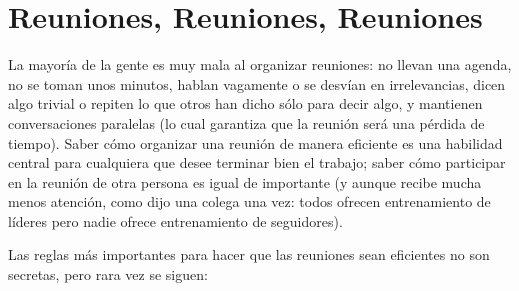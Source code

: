 \chapter{Reuniones, Reuniones, Reuniones}\label{s:meetings}

La mayoría de la gente es muy mala al organizar reuniones:
no llevan una agenda,
no se toman unos minutos,
hablan vagamente o se desvían en irrelevancias,
dicen algo trivial o repiten lo que otros han dicho
sólo para decir algo,
y mantienen conversaciones paralelas 
(lo cual garantiza que la reunión será una pérdida de tiempo).
Saber cómo organizar una reunión de manera eficiente
es una habilidad central para cualquiera que desee terminar bien el trabajo;
saber cómo participar en la reunión de otra persona es igual de importante
(y aunque recibe mucha menos atención, como dijo una colega una vez:
todos ofrecen entrenamiento de líderes
pero nadie ofrece entrenamiento de seguidores).

Las reglas más importantes para hacer que las reuniones sean eficientes no son secretas,
pero rara vez se siguen:

